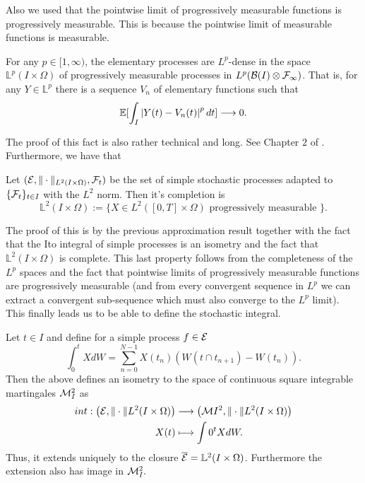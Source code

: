 \documentclass[
    a4paper,
    DIV=14,
    abstract=true,
    numbers=noenddot
]{scrartcl}
\begin{document}
Also we used that the pointwise limit of progressively measurable functions is progressively measurable. This is because the pointwise limit of measurable functions is measurable.
\begin{lemma}
	For any $p \in[1, \infty)$, the elementary processes are $L^{p}$-dense in the space $\mathbb{L}^{p}(I\times\Omega)$ of progressively measurable processes in $L^p(\mathcal{B}(I)\otimes\mathcal{F}_\infty)$. That is, for any $Y \in \mathbb{L}^{p}$ there is a sequence $V_{n}$ of elementary functions such that
	$$
		\mathbb{E}[\int_{I}\left|Y(t)-V_{n}(t)\right|^{p} dt] \longrightarrow 0.
	$$
\end{lemma}
The proof of this fact is also rather technical and long. See Chapter $2$ of \cite{Lalley2013NOTESOT}. Furthermore, we have that
\begin{theorem}
	Let $(\mathcal{E},\|\cdot\|_{L^2(I\times\Omega)},\mathcal{F}_t)$ be the set of simple stochastic processes adapted to $\{\mathcal{F}_t\}_{t\in I}$ with the $L^2$ norm. Then it's completion is
	\begin{equation*}
		\mathbb{L}^2(I\times\Omega):=\{X\in L^2([0,T]\times\Omega)\text{ progressively measurable }\}.
	\end{equation*}
\end{theorem}
The proof of this is by the previous approximation result together with the fact that the Ito integral of simple processes is an isometry and the fact that $\mathbb{L}^2(I\times\Omega)$ is complete. This last property follows from the completeness of the $L^p$ spaces and the fact that pointwise limits of progressively measurable functions are progressively measurable (and from every convergent sequence in $L^p$ we can extract a convergent sub-sequence which must also converge to the $L^p$ limit).
This finally leads us to be able to define the stochastic integral.
\begin{theorem}
	Let $t\in I$ and define for a simple process $f\in\mathcal{E}$ $$\int_{0}^t X dW=\sum_{n=0}^{N-1} X(t_n)(W(t\cap t_{n+1})-W(t_n)).$$
	Then the above defines an isometry to the space of continuous square integrable martingales $\mathcal{M}_I^2$ as
	\begin{align*}
		int: \left(\mathcal{E},\|\cdot\| {L^2(I\times\Omega)}\right) & \longrightarrow  \left(\mathcal{M} I^2,\|\cdot\| {L^2(I\times\Omega)}\right) \\
		X(t)                                                           & \longmapsto \int {0}^t X dW
		.\end{align*}
	Thus, it extends uniquely to the closure $\overline{\mathcal{E}}=\mathbb{L}^2(I\times\Omega)$. Furthermore the extension also has image in $\mathcal{M}_I^2.$
\end{theorem}
\end{document}
